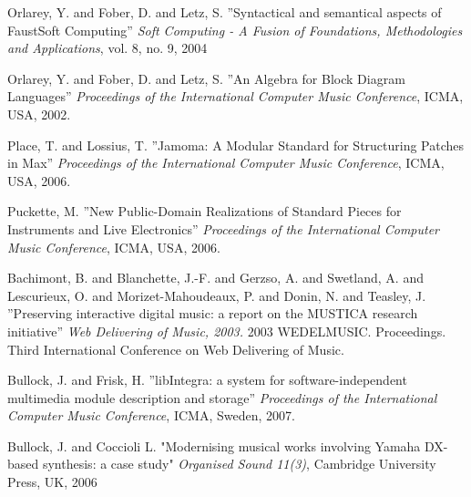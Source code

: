 \documentclass[10pt,journal,final]{IEEEtran}
\begin{document}
\begin{thebibliography}{citations}

 Orlarey, Y. and Fober, D. and Letz, S.
''Syntactical and semantical aspects of FaustSoft Computing''
{\it Soft Computing - A Fusion of Foundations, Methodologies and Applications}, vol. 8, no. 9, 2004

 Orlarey, Y. and Fober, D. and Letz, S.
''An Algebra for Block Diagram Languages''
{\it Proceedings of the International Computer Music Conference}, ICMA, USA, 2002.

 Place, T. and Lossius, T.
''Jamoma: A Modular Standard for Structuring Patches in Max''
{\it Proceedings of the International Computer Music Conference}, ICMA, USA, 2006.

 Puckette, M.
''New Public-Domain Realizations of Standard Pieces for Instruments and
Live Electronics''
{\it Proceedings of the International Computer Music Conference}, ICMA, USA, 2006.

 Bachimont, B. and Blanchette, J.-F. and Gerzso, A. and Swetland, A. and Lescurieux, O. and Morizet-Mahoudeaux, P. and Donin, N. and Teasley, J.
''Preserving interactive digital music: a report on the MUSTICA research initiative''
{\it Web Delivering of Music, 2003.} 2003 WEDELMUSIC. Proceedings. Third International Conference on Web Delivering of Music.

 Bullock, J. and Frisk, H.
''libIntegra: a system for software-independent multimedia module description and storage''
{\it Proceedings of the International Computer Music Conference}, ICMA, Sweden, 2007.

 Bullock, J. and Coccioli L.
"Modernising musical works involving Yamaha DX-based synthesis: a case study"
{\it Organised Sound 11(3)}, Cambridge University Press, UK, 2006

\end{thebibliography}
\newpage
\end{document}
